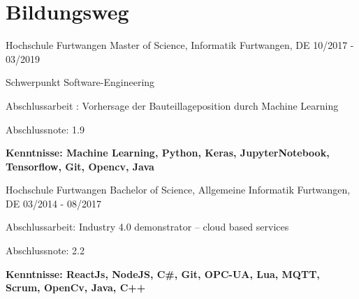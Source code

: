 
\section{Bildungsweg}
\cventry
{Hochschule Furtwangen} %
{Master of Science, Informatik} %
{Furtwangen, DE} %
{10/2017 - 03/2019} %
\begin{cvitems}
\item{ Schwerpunkt Software-Engineering}
\item {Abschlussarbeit : Vorhersage der Bauteillageposition durch Machine Learning}
\item {Abschlussnote: 1.9}
\item {\textbf{Kenntnisse: Machine Learning, Python, Keras, JupyterNotebook, Tensorflow, Git, Opencv, Java}}
\end{cvitems}

\cventry
{Hochschule Furtwangen} %
{Bachelor of Science, Allgemeine Informatik} %
{Furtwangen, DE} %
{03/2014 - 08/2017} %
\begin{cvitems}
\item {Abschlussarbeit: Industry 4.0 demonstrator – cloud based services}
\item {Abschlussnote: 2.2}
\item {\textbf{Kenntnisse: ReactJs, NodeJS, C\#, Git, OPC-UA, Lua, MQTT, Scrum, OpenCv, Java, C++}}
\end{cvitems}
